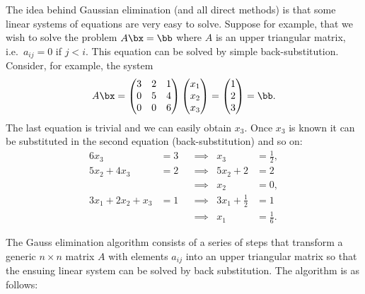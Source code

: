 The idea behind Gaussian elimination (and all direct methods) is that
some linear systems of equations are very easy to solve.   Suppose for
example, that we wish to solve the problem $A \bx = \bb$ where $A$ is
an upper triangular matrix, i.e.\ $a_{i j} = 0$ if $j < i$.    This
equation can be solved by simple back-substitution.   Consider, for
example, the system
%
\begin{equation*}
  A \bx =
  \begin{pmatrix}
    3 & 2 & 1 \\ 0 & 5 & 4 \\ 0 & 0 & 6
  \end{pmatrix}
  \begin{pmatrix}
    x_1 \\ x_2 \\ x_3
  \end{pmatrix}
 = 
 \begin{pmatrix}
   1 \\ 2 \\ 3
 \end{pmatrix}
 = \bb .
\end{equation*}
%
The last equation is trivial and we can easily obtain $x_3$.  Once
$x_3$ is known it can be substituted in the second equation
(back-substitution) and so on:
%
\begin{align*}
 6 x_3               & = 3 && \implies & x_3                 & = \frac{1}{2} , \\
 5 x_2 + 4 x_3       & = 2 && \implies & 5 x_2 + 2           & = 2 \\
                     &     && \implies & x_2                 & = 0 , \\
 3 x_1 + 2 x_2 + x_3 & = 1 && \implies & 3 x_1 + \frac{1}{2} & = 1 \\
                     &     && \implies & x_1                 & = \frac{1}{6} .   
\end{align*}

The Gauss elimination algorithm consists of a series of steps that
transform a generic $n \times n$ matrix $A$ with elements $a_{i j}$
into an upper triangular matrix so that the ensuing linear system can
be solved by back substitution.  The algorithm is as follows:

